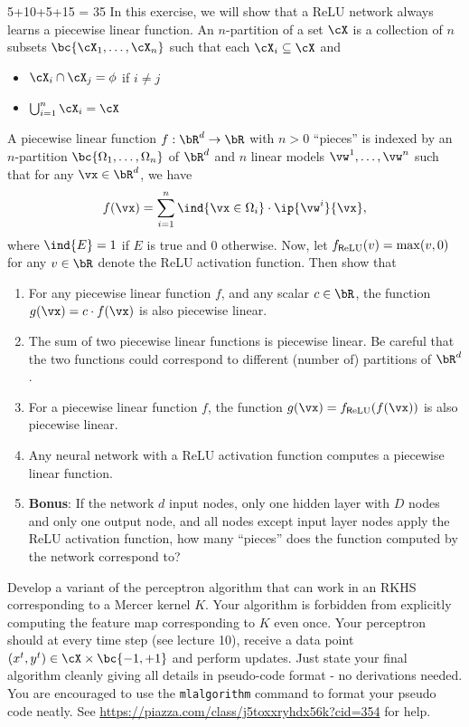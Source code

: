 \documentclass[a4paper,11pt]{article}
\begin{document}
\begin{mlproblem}{5+10+5+15 = 35} In this exercise, we will show that a ReLU network always learns a piecewise linear function. An $n$-partition of a set $\cX$ is a collection of $n$ subsets $\bc{\cX_1,\ldots,\cX_n}$ such that each $\cX_i \subseteq \cX$ and
\begin{itemize}
	\item $\cX_i \cap \cX_j = \phi$ if $i \neq j$
	\item $\bigcup_{i=1}^n \cX_i = \cX$
\end{itemize}
 A piecewise linear function $f: \bR^d \rightarrow \bR$ with $n > 0$ ``pieces'' is indexed by an $n$-partition $\bc{\Omega_1,\ldots,\Omega_n}$ of $\bR^d$ and $n$ linear models $\vw^1,\ldots,\vw^n$ such that for any $\vx \in \bR^d$, we have
\[
f(\vx) = \sum_{i=1}^n \ind{\vx \in \Omega_i}\cdot\ip{\vw^i}{\vx},
\]
where $\ind{E} = 1$ if $E$ is true and $0$ otherwise. Now, let $f_{\text{\textsf ReLU}}(v) = \max(v,0)$ for any $v \in \bR$ denote the ReLU activation function. Then show that
\begin{enumerate}
	\item For any piecewise linear function $f$, and any scalar $c \in \bR$, the function $g(\vx) = c\cdot f(\vx)$ is also piecewise linear.
	\item The sum of two piecewise linear functions is piecewise linear. Be careful that the two functions could correspond to different (number of) partitions of $\bR^d$.
	\item For a piecewise linear function $f$, the function $g(\vx) = \rf(f(\vx))$ is also piecewise linear.
	\item Any neural network with a ReLU activation function computes a piecewise linear function.
	\item \textbf{Bonus}: If the network $d$ input nodes, only one hidden layer with $D$ nodes and only one output node, and all nodes except input layer nodes apply the ReLU activation function, how many ``pieces'' does the function computed by the network correspond to?
\end{enumerate}
\end{mlproblem}

\begin{mlproblem}{25}
Develop a variant of the perceptron algorithm that can work in an RKHS corresponding to a Mercer kernel $K$. Your algorithm is forbidden from explicitly computing the feature map corresponding to $K$ even once. Your perceptron should at every time step (see lecture 10), receive a data point $(x^t,y^t) \in \cX \times \bc{-1,+1}$ and perform updates. Just state your final algorithm cleanly giving all details in pseudo-code format - no derivations needed. You are encouraged to use the \texttt{mlalgorithm} command to format your pseudo code neatly. See \url{https://piazza.com/class/j5toxxryhdx56k?cid=354} for help.
\end{mlproblem}
\end{document}
